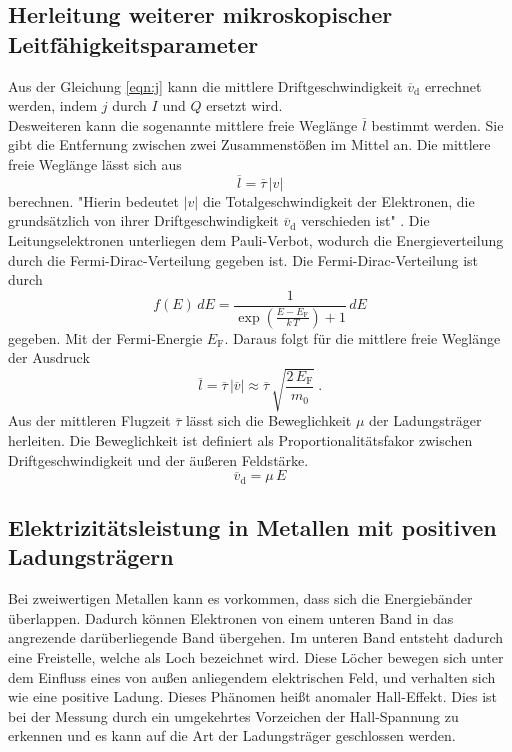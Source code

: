 \subsection{Herleitung weiterer mikroskopischer Leitfähigkeitsparameter}
Aus der Gleichung \eqref{eqn:j} kann die mittlere Driftgeschwindigkeit $\overline{v}_\text{d}$ errechnet werden, indem $j$ durch $I$ und $Q$ ersetzt wird. \\
Desweiteren kann die sogenannte mittlere freie Weglänge $\overline{l}$ bestimmt werden. Sie gibt die Entfernung zwischen zwei Zusammenstößen im Mittel an. Die mittlere freie Weglänge lässt sich aus
\begin{equation}
	\overline{l} = \overline{\tau}\,|v|
	\label{eqn:l}
\end{equation}
berechnen. "Hierin bedeutet $|v|$ die Totalgeschwindigkeit der Elektronen, die grundsätzlich von ihrer Driftgeschwindigkeit $\overline{v}_\text{d}$ verschieden ist" \cite[6]{sample}. Die Leitungselektronen unterliegen dem Pauli-Verbot, wodurch die Energieverteilung durch die Fermi-Dirac-Verteilung gegeben ist. Die Fermi-Dirac-Verteilung ist durch
\begin{equation}
	f(E)\,dE = \frac{1}{\exp\left(\frac{E - E_\text{F}}{k\,T}\right) + 1}\,dE
\end{equation}
gegeben. Mit der Fermi-Energie $E_\text{F}$. Daraus folgt für die mittlere freie Weglänge der Ausdruck
\begin{equation}
	\overline{l} = \overline{\tau}\,|\overline{v}| \approx \overline{\tau}\,\sqrt{\frac{2\,E_\text{F}}{m_0}} \ .
\end{equation}
Aus der mittleren Flugzeit $\overline{\tau}$ lässt sich die Beweglichkeit $\mu$ der Ladungsträger herleiten. Die Beweglichkeit ist definiert als Proportionalitätsfakor zwischen Driftgeschwindigkeit und der äußeren Feldstärke.
\begin{equation}
	\overline{v}_\text{d} = \mu\,E
\end{equation}


\subsection{Elektrizitätsleistung in Metallen mit positiven Ladungsträgern}
Bei zweiwertigen Metallen kann es vorkommen, dass sich die Energiebänder überlappen. Dadurch können Elektronen von einem unteren Band in das angrezende darüberliegende Band übergehen. Im unteren Band entsteht dadurch eine Freistelle, welche als Loch bezeichnet wird. Diese Löcher bewegen sich unter dem Einfluss eines von außen anliegendem elektrischen Feld, und verhalten sich wie eine positive Ladung. Dieses Phänomen heißt anomaler Hall-Effekt. Dies ist bei der Messung durch ein umgekehrtes Vorzeichen der Hall-Spannung zu erkennen und es kann auf die Art der Ladungsträger geschlossen werden.







